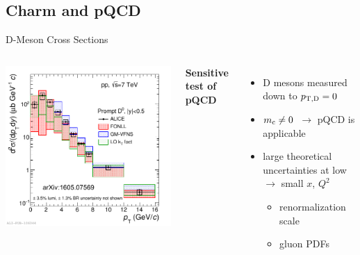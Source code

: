 \documentclass{beamer}
\begin{document}
\subsection{Charm and pQCD}
\begin{frame}{D-Meson Cross Sections}
\begin{columns}
\includegraphics[width=\textwidth]{img/ALICE_D0Meson}

\textbf{\alert{Sensitive test of pQCD}}
\begin{itemize}
\item D mesons measured down to \alert{$p_{\mathrm{T,D}}=0$~\GeVc}
\item \alert{$m_{\rm c} \neq 0$}~$\rightarrow$ pQCD is applicable
\item large theoretical uncertainties at low \ptd $\rightarrow$ \alert{small $x$, $Q^2$}
\begin{itemize}
\item renormalization scale
\item gluon PDFs
\end{itemize}
\end{itemize}
\end{columns}
\end{frame}
\end{document}
